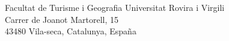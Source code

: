 \recipient
  {Facultat de Turisme i Geografia}
  {Universitat Rovira i Virgili\\Carrer de Joanot Martorell, 15\\43480 Vila-seca, Catalunya, España}
